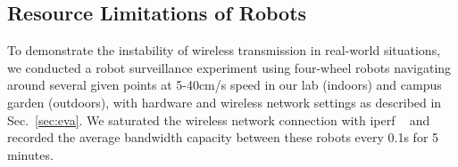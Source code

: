 
\subsection{Resource Limitations of Robots}

To demonstrate the instability of wireless transmission in real-world situations, we conducted a robot surveillance experiment using four-wheel robots navigating around several given points at 5-40cm/s speed in our lab (indoors) and campus garden (outdoors), with hardware and wireless network settings as described in Sec.~\ref{sec:eva}. 
We saturated the wireless network connection with iperf ~\cite{noauthor_iperf_nodate} and recorded the average bandwidth capacity between these robots every 0.1s for 5 minutes.

